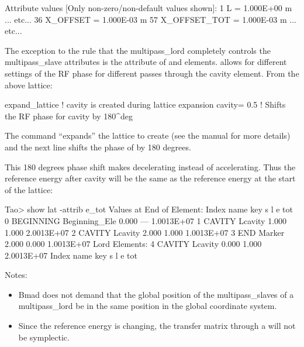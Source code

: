 \documentclass{hitec}     %
\begin{document}
{\begin{code}
 Attribute values [Only non-zero/non-default values shown]:
    1   L          =  1.000E+00 m
... etc...
   36   X_OFFSET   =  1.000E-03 m        57   X_OFFSET_TOT  =  1.000E-03 m
... etc...
\end{code}

The exception to the rule that the multipass_lord completely controls the multipass_slave attributes
is the  attribute of  and  elements. 
allows for different settings of the RF phase for different passes through the cavity element.
From the above lattice:
\begin{code}
expand_lattice                 ! cavity\2 is created during lattice expansion
cavity = 0.5 ! Shifts the RF phase for cavity\2 by 180^deg
\end{code}
The  command ``expands'' the lattice to create  (see the \bmad
manual for more details) and the next line shifts the phase of  by 180 degrees.

This 180 degrees phase shift makes  decelerating instead of accelerating. Thus the
reference energy after cavity  will be the same as the reference energy at the start
of the lattice:
\begin{code}
Tao> show lat -attrib e_tot
      Values at End of Element:
 Index  name      key                      s       l           e
                                                             tot
     0  BEGINNING Beginning_Ele        0.000     ---  1.0013E+07
     1  CAVITY\1  Lcavity              1.000   1.000  2.0013E+07
     2  CAVITY\2  Lcavity              2.000   1.000  1.0013E+07
     3  END       Marker               2.000   0.000  1.0013E+07
Lord Elements:
     4  CAVITY    Lcavity              0.000   1.000  2.0013E+07
 Index  name      key                      s       l           e
                                                             tot
\end{code}

Notes:
\vspace{-5 pt}
\begin{itemize}
\item 
Bmad does not demand that the global position of the multipass_slaves of a multipass_lord be in
the same position in the global coordinate system.
\item
Since the reference energy is changing, the transfer matrix through a  will
not be symplectic.
\end{itemize}

}
\end{document}

